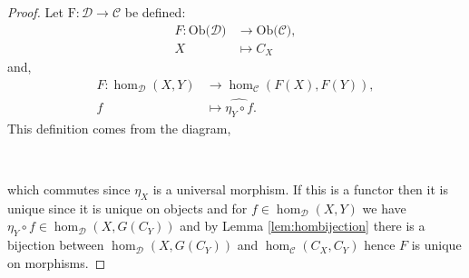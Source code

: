 \documentclass[11pt,a4paper]{article}
\theoremstyle{definition}
\newcommand\ho[3][]{\hom_{#1}(#2,#3)}
\newcommand\ob[1]{\mathrm{Ob(}#1\mathrm{)}}
\newcommand\cat[1]{\mathscr{#1}}
\newcommand\func[3]{\mathrm{#1}\colon#2\rightarrow#3}
\numberwithin{equation}{section}
\begin{document}
\begin{proof}
Let $\func{F}{\cat{D}}{\cat{C}}$ be defined:
\begin{align*}
    F\colon\ob{\cat{D}}&\to\ob{\cat{C}},\\
    X&\mapsto C_{X}
\end{align*}
and,
\begin{align*}
    F\colon\ho[\cat{D}]{X}{Y}&\to\ho[\cat{C}]{F(X)}{F(Y)},\\
    f&\mapsto \widehat{\eta_{Y}\circ f}.
\end{align*}
This definition comes from the diagram,
\begin{center}
    \\
    \end{center}
which commutes since $\eta_{X}$ is a universal morphism.
If this is a functor then it is unique since it is unique on objects and for $f\in\ho[\cat{D}]{X}{Y}$ we have $\eta_{Y}\circ f\in\ho[\cat{D}]{X}{G(C_{Y})}$ and by Lemma \ref{lem:hombijection} there is a bijection between $\ho[\cat{D}]{X}{G(C_{Y})}$ and $\ho[\cat{C}]{C_{X}}{C_{Y}}$ hence $F$ is unique on morphisms.


\end{proof}
\end{document}
